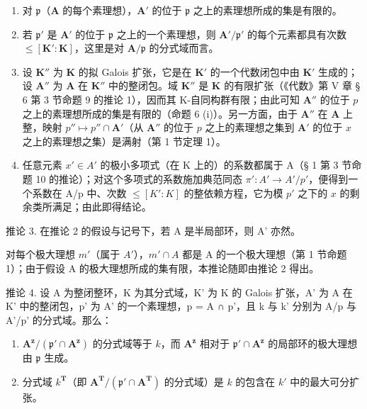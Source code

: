 \begin{enumerate}
\def\labelenumi{(\roman{enumi})}
\item
  对 \(\mathfrak{p}\)（\(\mathbf{A}\) 的每个素理想），\(\mathbf{A}'\) 的位于 \(\mathfrak{p}\) 之上的素理想所成的集是有限的。\\
\item
  若 \(\mathfrak{p}'\) 是 \(\mathbf{A}'\) 的位于 \(\mathfrak{p}\) 之上的一个素理想，则 \(\mathbf{A}' / \mathfrak{p}'\) 的每个元素都具有次数 \(\leqslant [\mathbf{K}' : \mathbf{K}]\)，这里是对 \(\mathbf{A} / \mathfrak{p}\) 的分式域而言。
\item
  设 \(\mathbf{K}''\) 为 \(\mathbf{K}\) 的拟 Galois 扩张，它是在 \(\mathbf{K}'\) 的一个代数闭包中由 \(\mathbf{K}'\) 生成的；设 \(\mathbf{A}''\) 为 \(\mathbf{A}\) 在 \(\mathbf{K}''\) 中的整闭包。域 \(\mathbf{K}''\) 是 \(\mathbf{K}\) 的有限扩张（《代数》第 V 章 § 6 第 3 节命题 9 的推论 1），因而其 K-自同构群有限；由此可知 \(\mathbf{A}''\) 的位于 \(p\) 之上的素理想所成的集是有限的（命题 6 (i)）。另一方面，由于 \(\mathbf{A}''\) 在 \(\mathbf{A}\) 上整，映射 \(p'' \mapsto p'' \cap \mathbf{A}'\)（从 \(\mathbf{A}''\) 的位于 \(p\) 之上的素理想之集到 \(\mathbf{A}'\) 的位于 \(x\) 之上的素理想之集）是满射（第 1 节定理 1）。
\item
  任意元素 \(x' \in A'\) 的极小多项式（在 K 上的）的系数都属于 A（§ 1 第 3 节命题 10 的推论）；对这个多项式的系数施加典范同态 \(\pi': A' \to A'/p'\)，便得到一个系数在 A/p 中、次数 \(\leqslant [K': K]\) 的整依赖方程，它为模 \(p'\) 之下的 \(x\) 的剩余类所满足；由此即得结论。
\end{enumerate}

推论 3. 在推论 2 的假设与记号下，若 A 是半局部环，则 A' 亦然。

对每个极大理想 \(m'\)（属于 \(A'\)），\(m' \cap A\) 都是 A 的一个极大理想（第 1 节命题 1）；由于假设 A 的极大理想所成的集有限，本推论随即由推论 2 得出。

推论 4. 设 A 为整闭整环，K 为其分式域，K' 为 K 的 Galois 扩张，A' 为 A 在 K' 中的整闭包，p' 为 A' 的一个素理想，p = A ∩ p'，且 k 与 k' 分别为 A/p 与 A'/p' 的分式域。那么：

\begin{enumerate}
\def\labelenumi{(\roman{enumi})}
\item
  \(\mathbf{A}^{\mathbf{z}} / (\mathfrak{p}'\cap \mathbf{A}^{\mathbf{z}})\) 的分式域等于 \(k\)，而 \(\mathbf{A}^{\mathbf{z}}\) 相对于 \(\mathfrak{p}'\cap \mathbf{A}^{\mathbf{z}}\) 的局部环的极大理想由 \(\mathfrak{p}\) 生成。
\item
  分式域 \(k^{\mathbf{T}}\)（即 \(\mathbf{A}^{\mathbf{T}} / (\mathfrak{p}' \cap \mathbf{A}^{\mathbf{T}})\) 的分式域）是 \(k\) 的包含在 \(k'\) 中的最大可分扩张。
\end{enumerate}

